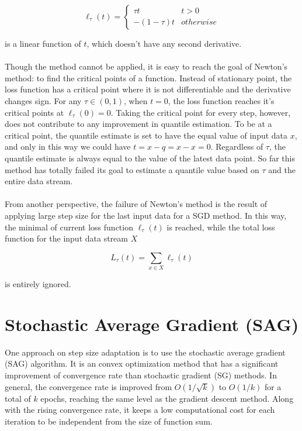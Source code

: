 \begin{equation}
    \ell_\tau(t)= 
        \begin{cases}
            \tau t & t > 0\\
            -(1-\tau) t & otherwise
        \end{cases}
\end{equation}


is a linear function of $t$, which doesn't have any second derivative. 
\\\\
Though the method cannot be applied, it is easy to reach the goal of Newton's method: to find the critical points of a function. Instead of stationary point, the loss function has a critical point where it is not differentiable and the derivative changes sign. For any $\tau \in (0,1)$, when $t=0$, the loss function reaches it's critical points at $\ell_\tau(0) = 0$. Taking the critical point for every step, however, does not contribute to any improvement in quantile estimation. To be at a critical point, the quantile estimate is set to have the equal value of input data $x$, and only in this way we could have $t = x-q = x-x = 0$. Regardless of $\tau$, the quantile estimate is always equal to the value of the latest data point. So far this method has totally failed its goal to estimate a quantile value based on $\tau$ and the entire data stream.
\\\\
From another perspective, the failure of Newton's method is the result of applying large step size for the last input data for a SGD method. In this way, the minimal of current loss function $\ell_\tau(t)$ is reached, while the total loss function for the input data stream $X$

\begin{equation}
    L_{\tau}(t) = \sum_{x \in X} \ell_{\tau}(t)
\end{equation}

is entirely ignored.


\graphicspath{{Figures/Smooth_func/}{./}} 


\section{Stochastic Average Gradient (SAG)}
\label{sec: sag}
One approach on step size adaptation is to use the stochastic average gradient (SAG)\cite{schmidtMinimizingFiniteSums2016} algorithm. It is an convex optimization method that has a significant improvement of convergence rate than stochastic gradient (SG) methods. In general, the convergence rate is improved from $O(1/\sqrt{k})$ to $O(1/k)$ for a total of $k$ epochs, reaching the same level as the gradient descent method. Along with the rising convergence rate, it keeps a low computational cost for each iteration to be independent from the size of function sum.

